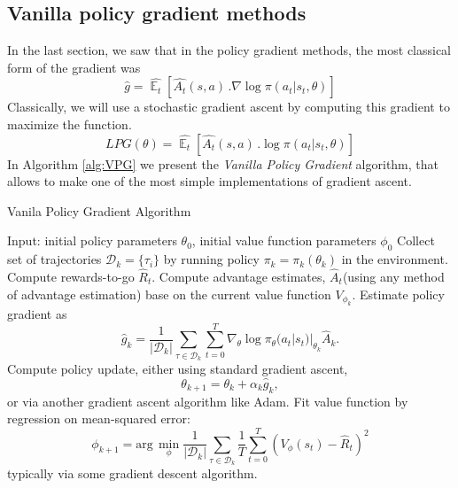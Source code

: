 \documentclass{article}
\DeclareMathOperator{\E}{\mathbb{E}}
\begin{document}
\subsection{Vanilla policy gradient methods}

In the last section, we saw that in the policy gradient methods, the most classical form of the gradient was 
$$
\hat{g} =  \hat{\E_{t}} \left[\hat{A_t}(s, a)\, .\nabla \log \pi(a_t |s_t, \theta)  \right] 
$$
Classically, we will use a stochastic gradient ascent by computing this gradient to maximize the function.
$$ LPG(\theta) = \hat{\E_{t}} \left[\hat{A_t}(s, a)\, .\log \pi(a_t |s_t, \theta)  \right] $$
In Algorithm \ref{alg:VPG} we present the \textit{Vanilla Policy Gradient} algorithm, that allows to make one of the most simple implementations of gradient ascent.
\begin{algorithm}[h]
\caption{Vanila Policy Gradient Algorithm}\label{alg:VPG}
\begin{algorithmic}[1]
\State Input: initial policy parameters $\theta_0$, initial value function parameters $\phi_0$
\State Collect set of trajectories $\mathcal{D}_k = \{\tau_i\}$ by running policy $\pi_k = \pi_k(\theta_k)$ in the environment.
\State Compute rewards-to-go $\hat{R}_t$.
\State Compute advantage estimates, $\hat{A}_t$(using any method of advantage estimation) base on the current value function $V_{\phi_k}$.
\State Estimate policy gradient as 
$$
\hat{g}_k = \frac{1}{|\mathcal{D}_k|} \sum_{\tau\in\mathcal{D}_k}\sum_{t=0}^{T}\nabla_{\theta} \log \pi_{\theta}(a_t |s_t)|_{\theta_k} \hat{A}_k.
$$
\State Compute policy update, either using standard gradient ascent,
$$
\theta_{k+1} = \theta_{k} + \alpha_k \hat{g}_k,
$$
or via another gradient ascent algorithm like Adam.
\State Fit value function by regression on mean-squared error:
$$
\phi_{k+1} = \text{arg}\, \min_{\phi} \frac{1}{|\mathcal{D}_k|}\sum_{\tau\in\mathcal{D}_k}\frac{1}{T}\sum_{t=0}^{T}(V_\phi(s_t)-\hat{R}_t)^2
$$
typically via some gradient descent algorithm.
\EndFor
\end{algorithmic}
\end{algorithm}
\end{document}
